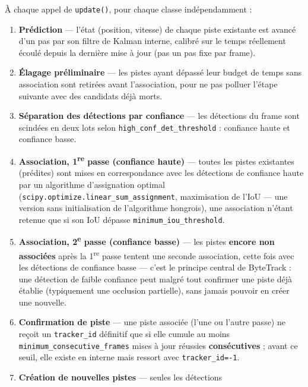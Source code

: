 \documentclass[11pt,a4paper]{article}
\begin{document}
    À chaque appel de \texttt{update()}, pour chaque classe indépendamment :
    
    \begin{enumerate}[leftmargin=1.7em]
      \item \textbf{Prédiction} --- l'état (position, vitesse) de chaque
        piste existante est avancé d'un pas par son filtre de Kalman
        interne, calibré sur le temps réellement écoulé depuis la dernière
        mise à jour (pas un pas fixe par frame).
      \item \textbf{Élagage préliminaire} --- les pistes ayant dépassé leur
        budget de temps sans association sont retirées avant l'association,
        pour ne pas polluer l'étape suivante avec des candidats déjà morts.
      \item \textbf{Séparation des détections par confiance} --- les
        détections du frame sont scindées en deux lots selon
        \texttt{high\_conf\_det\_threshold} : confiance haute et confiance
        basse.
      \item \textbf{Association, 1\textsuperscript{re} passe (confiance haute)} ---
        toutes les pistes existantes (prédites) sont mises en correspondance
        avec les détections de confiance haute par un algorithme
        d'assignation optimal (\texttt{scipy.optimize.linear\_sum\_assignment},
        maximisation de l'IoU --- une version sans initialisation de
        l'algorithme hongrois), une association n'étant retenue que si son
        IoU dépasse \texttt{minimum\_iou\_threshold}.
      \item \textbf{Association, 2\textsuperscript{e} passe (confiance basse)} --- les
        pistes \textbf{encore non associées} après la 1\textsuperscript{re} passe
        tentent une seconde association, cette fois avec les détections de
        confiance basse --- c'est le principe central de ByteTrack : une
        détection de faible confiance peut malgré tout confirmer une piste
        déjà établie (typiquement une occlusion partielle), sans jamais
        pouvoir en créer une nouvelle.
      \item \textbf{Confirmation de piste} --- une piste associée (l'une ou
        l'autre passe) ne reçoit un \texttt{tracker\_id} définitif que si
        elle cumule au moins \texttt{minimum\_consecutive\_frames} mises à
        jour réussies \textbf{consécutives} ; avant ce seuil, elle existe en
        interne mais ressort avec \texttt{tracker\_id=-1}.
      \item \textbf{Création de nouvelles pistes} --- seules les détections

\end{enumerate}
\end{document}

